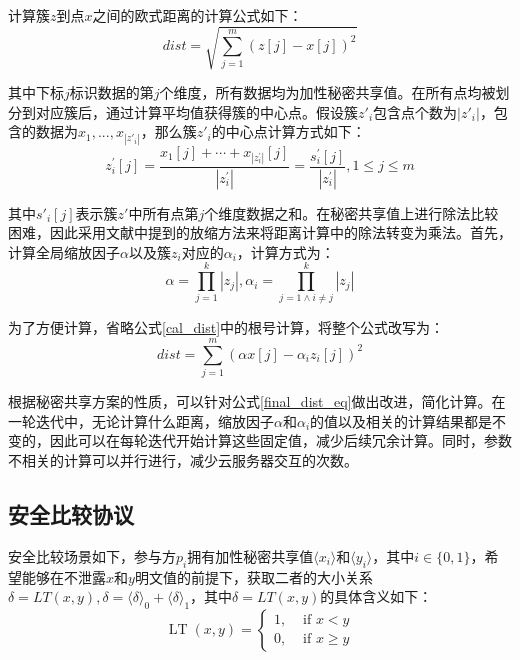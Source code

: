 计算簇$z$到点$x$之间的欧式距离的计算公式如下：
\begin{equation}
	\label{cal_dist}
	dist=\sqrt{\sum_{j=1}^m\left(z[j]-x[j]\right)^2}
\end{equation}

其中下标$j$标识数据的第$j$个维度，所有数据均为加性秘密共享值。在所有点均被划分到对应簇后，通过计算平均值获得簇的中心点。假设簇$z'_i$包含点个数为$|z'_i|$，包含的数据为${x_1,...,x_{|z'_i|}}$，那么簇$z'_i$的中心点计算方式如下：
\begin{equation}
	\label{cal_center}
	z_{i}^{\prime}[j]=\frac{x_{1}[j]+\cdots+x_{\left|z_{i}^{\prime}\right|}[j]}{\left|z_{i}^{\prime}\right|}=\frac{s_{i}^{\prime}[j]}{\left|z_{i}^{\prime}\right|}, 1 \leq j \leq m
\end{equation}

其中$s'_i[j]$表示簇$z'$中所有点第$j$个维度数据之和。在秘密共享值上进行除法比较困难，因此采用文献\cite{wu2020secure}中提到的放缩方法来将距离计算中的除法转变为乘法。首先，计算全局缩放因子$\alpha$以及簇$z_i$对应的$\alpha_i$，计算方式为：
\begin{equation}
	\label{cal_scale}
	\alpha=\prod_{j=1}^{k}\left|z_{j}\right|, \alpha_{i}=\prod_{j=1 \wedge i \neq j}^{k}\left|z_{j}\right|
\end{equation}

为了方便计算，省略公式\ref{cal_dist}中的根号计算，将整个公式改写为：
\begin{equation}
	\label{final_dist_eq}
	dist = \sum_{j=1}^{m}(\alpha x[j] - \alpha_{i}z_i[j])^2
\end{equation}

根据秘密共享方案的性质，可以针对公式\ref{final_dist_eq}做出改进，简化计算。在一轮迭代中，无论计算什么距离，缩放因子$\alpha$和$\alpha_i$的值以及相关的计算结果都是不变的，因此可以在每轮迭代开始计算这些固定值，减少后续冗余计算。同时，参数不相关的计算可以并行进行，减少云服务器交互的次数。

\subsection{安全比较协议}
\label{s3-securecomparison}
安全比较场景如下，参与方$p_i$拥有加性秘密共享值$\langle x_i \rangle$和$\langle y_i \rangle$，其中$i \in \{0, 1\}$，希望能够在不泄露$x$和$y$明文值的前提下，获取二者的大小关系$\delta = LT(x, y), \delta = \langle \delta \rangle_0 + \langle \delta \rangle_1$，其中$\delta = LT(x, y)$的具体含义如下：
\begin{equation}
	\operatorname{LT}(x, y)= \begin{cases}1, & \text { if } x<y \\ 0, & \text { if } x \geq y\end{cases}
\end{equation}

